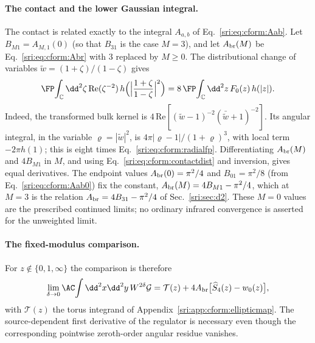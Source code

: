 \paragraph{The contact and the lower Gaussian integral.} The contact is related exactly to the integral
$A_{a,b}$ of Eq.~\eqref{sri:eq:cform:Aab}. Let $B_{M1}=A_{M,1}(0)$ (so that $B_{31}$ is the case $M=3$), and let
$A_{\rm br}(M)$ be Eq.~\eqref{sri:eq:cform:Abr} with
3 replaced by $M\ge0$. The distributional change of variables $\tilde w=(1+\zeta)/(1-\zeta)$ gives
\begin{equation}
 \FP\!\int_{\mathbb C}\dd^2\zeta\,\mathrm{Re}(\zeta^{-2})\,h\Bigl(\Bigl|\frac{1+\zeta}{1-\zeta}\Bigr|^2\Bigr)
 =8\,\FP\!\int_{\mathbb C}\dd^2z\,F_0(z)\,h(|z|).
 \label{sri:eq:cform:contactdist}
\end{equation}
Indeed, the transformed bulk kernel is $4\,\mathrm{Re}[(\tilde w-1)^{-2}(\bar{\tilde w}+1)^{-2}]$. Its angular
integral, in the variable $\varrho=|\tilde w|^2$, is $4\pi|\varrho-1|/(1+\varrho)^3$, with local term $-2\pi h(1)$; this
is eight times Eq.~\eqref{sri:eq:cform:radialfp}. Differentiating $A_{\rm br}(M)$ and $4B_{M1}$ in $M$, and using
Eq.~\eqref{sri:eq:cform:contactdist} and inversion, gives equal derivatives. The endpoint values $A_{\rm br}(0)=\pi^2/4$
and $B_{01}=\pi^2/8$ (from Eq.~\eqref{sri:eq:cform:Aab0}) fix the constant, $A_{\rm br}(M)=4B_{M1}-\pi^2/4$, which at $M=3$ is
the relation $A_{\rm br}=4B_{31}-\pi^2/4$ of Sec.~\ref{sri:sec:d2}. These $M=0$ values are the prescribed continued limits;
no ordinary infrared convergence is asserted for the unweighted limit.

\paragraph{The fixed-modulus comparison.} For $z\notin\{0,1,\infty\}$ the comparison is therefore
\begin{equation}
 \lim_{\delta\to0}\AC\!\int\dd^2x\dd^2y\,W^{2\delta}\mathcal G=\mathcal T(z)+4A_{\rm br}\bigl[\widehat S_4(z)-w_0(z)\bigr],
 \label{sri:eq:cform:fixedmod}
\end{equation}
with $\mathcal T(z)$ the torus integrand of Appendix~\ref{sri:app:cform:ellipticmap}. The source-dependent first derivative
of the regulator is necessary even though the corresponding pointwise zeroth-order angular residue vanishes.

